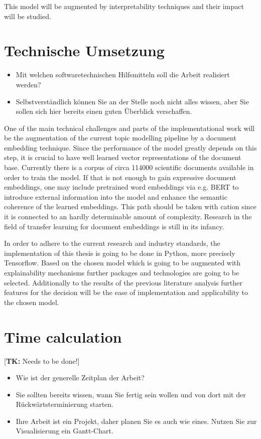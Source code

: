 \documentclass[pdftex,a4paper,12pt]{scrartcl}
\newcommand{\tk}[1]{\textcolor{tim}{[\textbf{TK:} #1]}}
\begin{document}
This model will be augmented by interpretability techniques and their impact will be studied.

\section{Technische Umsetzung}
\begin{itemize}
	\item Mit welchen softwaretechnischen Hilfsmitteln soll die Arbeit realisiert werden?
	\item Selbstverständlich können Sie an der Stelle noch nicht alles wissen, aber Sie sollen sich hier bereits einen guten Überblick verschaffen.
\end{itemize}

One of the main technical challenges and parts of the implementational work will be the augmentation of the current topic modelling pipeline by a document embedding technique. Since the performance of the model greatly depends on this step, it is crucial to have well learned vector representations of the document base. Currently there is a corpus of circa 114000 scientific documents available in order to train the model. If that is not enough to gain expressive document embeddings, one may include pretrained word embeddings via e.g. BERT to introduce external information into the model and enhance the semantic coherence of the learned embeddings. This path should be taken with cation since it is connected to an hardly determinable amount of complexity. Research in the field of transfer learning for document embeddings is still in its infancy.

In order to adhere to the current research and industry standards, the implementation of this thesis is going to be done in Python, more precisely Tensorflow. Based on the chosen model which is going to be augmented with explainability mechanisms further packages and technologies are going to be selected. Additionally to the results of the previous literature analysis further features for the decision will be the ease of implementation and applicability to the chosen model.

\section{Time calculation}
\tk{Needs to be done!}
\begin{itemize}
	\item Wie ist der generelle Zeitplan der Arbeit? 
	\item Sie sollten bereits wissen, wann Sie fertig sein wollen und von dort mit der Rückwärtsterminierung starten.
	\item Ihre Arbeit ist ein Projekt, daher planen Sie es auch wie eines. Nutzen Sie zur Visualisierung ein Gantt-Chart.
\end{itemize}


\newpage
{}
{}   %
\end{document}
